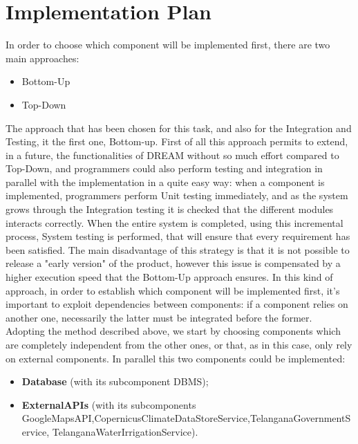 \section{Implementation Plan}

In order to choose which component will be implemented first, there are two main approaches:
\begin{itemize}
    \item Bottom-Up
    \item Top-Down 
\end{itemize}
The approach that has been chosen for this task, and also for the Integration and Testing, it the first one, Bottom-up.
First of all this approach permits to extend, in a future, the functionalities of DREAM without so much effort compared to Top-Down, and programmers could also perform testing and integration in parallel with the implementation in a quite easy way: when a component is implemented, programmers perform Unit testing immediately, and as the system grows through the Integration testing it is checked that the different modules interacts correctly. When the entire system is completed, using this incremental process, System testing is performed, that will ensure that every requirement has been satisfied.\newline
The main disadvantage of this strategy is that it is not possible to release a "early version" of the product, however this issue is compensated by a higher execution speed that the Bottom-Up approach ensures.
In this kind of approach, in order to establish which component will be implemented first, it's important to exploit dependencies between components: if a component relies on another one, necessarily the latter must be integrated before the former.
Adopting the method described above, we start by choosing components which are completely independent from the other ones, or that, as in this case, only rely on external components.\newline
In parallel this two components could be implemented: 
\begin{itemize}
    \item \textbf{Database} (with its subcomponent DBMS);
    \item \textbf{ExternalAPIs} (with its subcomponents GoogleMapsAPI,\newline CopernicusClimateDataStoreService,\newline TelanganaGovernmentService, TelanganaWaterIrrigationService).
\end{itemize}

